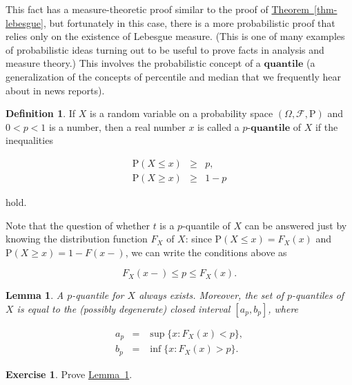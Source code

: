 \documentclass[11pt]{report}
\providecommand{\cal}{\mathcal}
\theoremstyle{plain}
\newtheorem{lem}[thm]{Lemma}
\theoremstyle{definition}
\newtheorem{defn}[thm]{Definition}
\newtheorem{xexercise}[thm]{Exercise}
\begin{document}
\noindent This fact has a measure-theoretic proof similar to
the proof of \hyperref[thm-lebesgue]{Theorem~\ref*{thm-lebesgue}}, but fortunately
in this case, there is a more probabilistic proof that
relies only on the existence of Lebesgue measure.
(This is one of many examples of probabilistic ideas
turning out to be useful to prove facts in analysis
and measure theory.) This involves the probabilistic
concept of a $\textbf{quantile}$ (a generalization of
the concepts of percentile and median that we
frequently hear about in news reports).

\begin{defn}
If $X$ is a random variable on a probability space
$(\Omega, {\cal F}, \mathrm{P})$ and $0<p<1$ is a
number, then a real number $x$ is called a $\textbf{$p
$-quantile}$ of $X$ if the inequalities

\begin{eqnarray*}
\mathrm{P}(X \le x) &\ge& p, \\
\mathrm{P}(X \ge x) & \ge & 1-p
\end{eqnarray*}

\noindent hold.
\end{defn}

\noindent Note that the question of whether $t$ is a
$p$-quantile of $X$ can be answered just by knowing
the distribution function $F_X$ of $X$: since
$\mathrm{P}(X\le x)=F_X(x)$ and
$\mathrm{P}(X\ge x)=1-F(x-)$, we can write the
conditions above as

\[
F_X(x-) \le p \le F_X(x).
\]

\begin{lem}
\label{lem-quantile}
A $p$-quantile for $X$ always exists. Moreover, the
set of $p$-quantiles of $X$ is equal to the (possibly
degenerate) closed interval $[a_p, b_p]$, where

\begin{eqnarray*}
a_p &=& \sup \{ x : F_X(x) < p \}, \\
b_p &=& \inf \{ x : F_X(x) > p \}.
\end{eqnarray*}

\end{lem}

\begin{xexercise}
Prove \hyperref[lem-quantile]{Lemma~\ref*{lem-quantile}}.
\end{xexercise}
\end{document}
